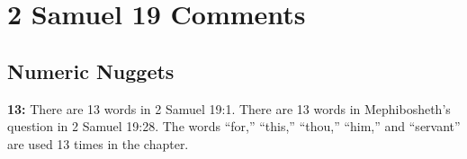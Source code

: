 \section{2 Samuel 19 Comments}

\subsection{Numeric Nuggets}
\textbf{13: } There are 13 words in 2 Samuel 19:1. There are 13 words in Mephibosheth's  question in 2 Samuel 19:28. The words ``for,'' ``this,'' ``thou,'' ``him,'' and ``servant'' are used 13 times in the chapter.

